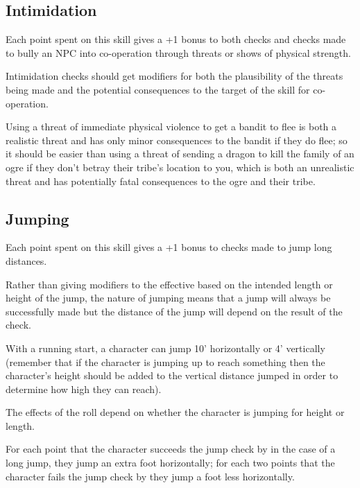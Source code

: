 \begin{multicols*}{2}
\subsection{Intimidation}\label{skill:Intimidation}
Each point spent on this skill gives a +1 bonus to both  checks and  checks made to bully an NPC into co-operation through threats or shows of physical strength.

Intimidation checks should get modifiers for both the plausibility of the threats being made and the potential consequences to the target of the skill for co-operation.

Using a threat of immediate physical violence to get a bandit to flee is both a realistic threat and has only minor consequences to the bandit if they do flee; so it should be easier than using a threat of sending a dragon to kill the family of an ogre if they don’t betray their tribe’s location to you, which is both an unrealistic threat and has potentially fatal consequences to the ogre and their tribe.


\subsection{Jumping}\label{skill:Jumping}
Each point spent on this skill gives a +1 bonus to  checks made to jump long distances.

Rather than giving modifiers to the effective  based on the intended length or height of the jump, the nature of jumping means that a jump will always be successfully made but the distance of the jump will depend on the result of the check.

With a running start, a character can jump 10’ horizontally or 4’ vertically (remember that if the character is jumping up to reach something then the character’s height should be added to the vertical distance jumped in order to determine how high they can reach).

The effects of the roll depend on whether the character is jumping for height or length.

For each point that the character succeeds the jump check by in the case of a long jump, they jump an extra foot horizontally; for each two points that the character fails the jump check by they jump a foot less horizontally.


\end{multicols*}
